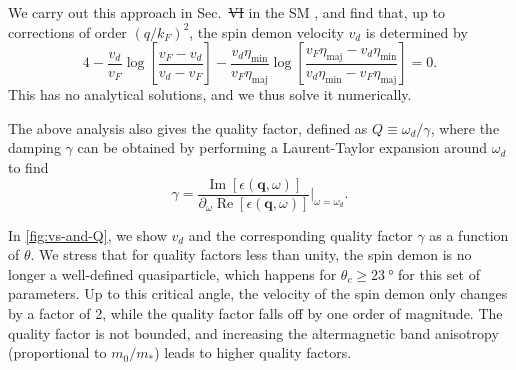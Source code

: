 \documentclass[aps,prl,reprint,twocolumns,superscriptaddress]{revtex4-2}
\newcommand{\deltaq}{\eta_{{\mathrm{min}}}(\theta)/\eta_{{\mathrm{maj}}}(\theta)}
\DeclareMathOperator{\Imm}{Im}
\DeclareMathOperator{\Ree}{Re}
\newcommand{\kF}{k_{F}}
\newcommand{\vs}{v_d}
\providecommand{\DIFaddtex}[1]{{\protect\color{blue}\uwave{#1}}} %
\providecommand{\DIFdeltex}[1]{{\protect\color{red}\sout{#1}}}                      %
\providecommand{\DIFaddbegin}{} %
\providecommand{\DIFaddend}{} %
\providecommand{\DIFdelbegin}{} %
\providecommand{\DIFdelend}{} %
\providecommand{\DIFadd}[1]{\texorpdfstring{\DIFaddtex{#1}}{#1}} %
\providecommand{\DIFdel}[1]{\texorpdfstring{\DIFdeltex{#1}}{}} %
\begin{document}
	We carry out this approach in Sec.~\DIFdelbegin \DIFdel{VI }\DIFdelend \DIFaddbegin \DIFadd{VIII }\DIFaddend in the SM \cite{Note1}, and find that, up to corrections of order $(q/\kF)^2$, the spin demon velocity $\vs$ is determined by 
	\begin{equation}
		4 -\frac{\vs}{v_F} \log\left[\frac{v_F-\vs}{\vs-v_F}\right] - \frac{\vs\eta_{{\mathrm{min}}}}{v_F\eta_{{\mathrm{maj}}}} \log\left[\frac{v_F\eta_{{\mathrm{maj}}}-\vs\eta_{{\mathrm{min}}}}{\vs\eta_{{\mathrm{min}}}-v_F\eta_{{\mathrm{maj}}}}\right] = 0. \label{eq:zeros-vs}
	\end{equation}
	This has no analytical solutions, and we thus solve it numerically.

	
	

	
	The above analysis also gives the quality factor, defined as $Q \equiv \omega_d / \gamma$, where the damping $\gamma$ can be obtained by performing a Laurent-Taylor expansion around $\omega_d$ to find 
	\begin{equation}
		\gamma = \frac{\Imm[\epsilon(\bm q,\omega)]}{\partial_\omega \Ree[\epsilon(\bm q,\omega)]}\Bigr|_{\omega=\omega_d}.
	\end{equation}

	
	In \cref{fig:vs-and-Q}, we show $\vs$ and the corresponding quality factor $\gamma$ as a function of $\theta$. We stress that for quality factors less than unity, the spin demon is no longer a well-defined quasiparticle, which happens for $\theta_c\ge\SI{23}{\degree}$ for this set of parameters. Up to this critical angle, the velocity of the spin demon only changes by a factor of 2, while the quality factor falls off by one order of magnitude. The quality factor is not bounded, and increasing the altermagnetic band anisotropy (proportional to $m_0/m_*$) leads to higher quality factors.

\end{document}

